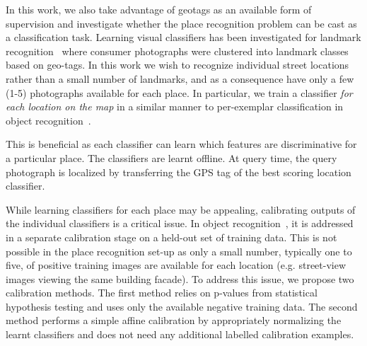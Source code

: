   In this work, we also take advantage of geotags as an available form of supervision and investigate whether the place recognition problem can be cast as a classification task.
 \textcolor{petr}{
    Learning visual classifiers has been investigated for landmark recognition~\cite{Li09} where consumer photographs were clustered into landmark classes based on geo-tags. 
  In this work we wish to recognize individual street locations rather than a small number of landmarks, and as a consequence have only a few (1-5) photographs available for each place.  In particular, we train a classifier {\em for each location on the map} in a similar manner to per-exemplar classification in object recognition~\cite{Malisiewicz11}. 
}


  This is beneficial as  each classifier can learn which features are discriminative for a particular place. %
   The classifiers are learnt offline. At query time, the query photograph is localized by transferring the GPS tag of the best scoring location classifier.

  While learning classifiers for each place may be appealing, calibrating outputs of the individual classifiers is a critical issue. In object recognition~\cite{Malisiewicz11}, it is addressed in a separate calibration stage on a held-out set of training data.
  This is not possible in the place recognition set-up as only a small number, typically one to five, of positive training images are available for each location (e.g. street-view images viewing the same building facade). To address this issue, we propose two calibration methods. 
  The first method relies on p-values from statistical hypothesis testing and uses only the available negative training data. The second method performs a simple affine calibration by appropriately normalizing the learnt classifiers and does not need any additional labelled calibration examples.   



